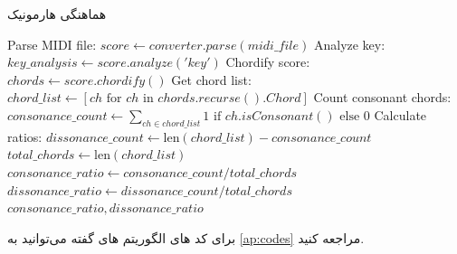 \begin{LTR}
      \begin{algorithm}
            \caption[هماهنگی هارمونیک]{هماهنگی هارمونیک}
            \setmainfont{Times New Roman}
            \label{alg:harmonicCoherence}
            \begin{algorithmic}[1]
                  \State Parse MIDI file: $score \leftarrow converter.parse(midi\_file)$
                  \State Analyze key: $key\_analysis \leftarrow score.analyze('key')$
                  \State Chordify score: $chords \leftarrow score.chordify()$
                  \State Get chord list: $chord\_list \leftarrow [ch \text{ for } ch \text{ in } chords.recurse().Chord]$
                  \State Count consonant chords:
                  \State $consonance\_count \leftarrow \sum_{ch \in chord\_list} 1 \text{ if } ch.isConsonant() \text{ else } 0$
                  \State Calculate ratios: $dissonance\_count \leftarrow \text{len}(chord\_list) - consonance\_count$
                  \State $total\_chords \leftarrow \text{len}(chord\_list)$
                  \State $consonance\_ratio \leftarrow consonance\_count / total\_chords$
                  \State $dissonance\_ratio \leftarrow dissonance\_count / total\_chords$
                  \State \Return $consonance\_ratio, dissonance\_ratio$
                  \EndProcedure
            \end{algorithmic}
      \end{algorithm}
\end{LTR}
برای کد های الگوریتم های گفته می‌توانید به \ref{ap:codes} مراجعه کنید.
